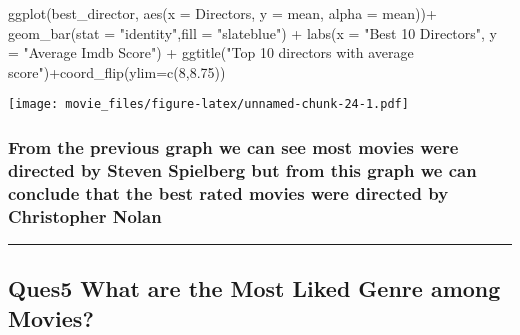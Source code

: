 \documentclass[
]{article}
\newenvironment{Shaded}{\begin{snugshade}}{\end{snugshade}}
\newcommand{\AttributeTok}[1]{\textcolor[rgb]{0.77,0.63,0.00}{#1}}
\newcommand{\DecValTok}[1]{\textcolor[rgb]{0.00,0.00,0.81}{#1}}
\newcommand{\FloatTok}[1]{\textcolor[rgb]{0.00,0.00,0.81}{#1}}
\newcommand{\FunctionTok}[1]{\textcolor[rgb]{0.00,0.00,0.00}{#1}}
\newcommand{\NormalTok}[1]{#1}
\newcommand{\SpecialCharTok}[1]{\textcolor[rgb]{0.00,0.00,0.00}{#1}}
\newcommand{\StringTok}[1]{\textcolor[rgb]{0.31,0.60,0.02}{#1}}
\begin{document}
\begin{Shaded}
\begin{Highlighting}[]
\FunctionTok{ggplot}\NormalTok{(best\_director, }\FunctionTok{aes}\NormalTok{(}\AttributeTok{x =}\NormalTok{ Directors, }\AttributeTok{y =}\NormalTok{ mean, }\AttributeTok{alpha =}\NormalTok{ mean))}\SpecialCharTok{+}
  \FunctionTok{geom\_bar}\NormalTok{(}\AttributeTok{stat =} \StringTok{"identity"}\NormalTok{,}\AttributeTok{fill =} \StringTok{"slateblue"}\NormalTok{) }\SpecialCharTok{+} \FunctionTok{labs}\NormalTok{(}\AttributeTok{x =} \StringTok{"Best 10 Directors"}\NormalTok{, }\AttributeTok{y =} \StringTok{"Average Imdb Score"}\NormalTok{) }\SpecialCharTok{+} 
  \FunctionTok{ggtitle}\NormalTok{(}\StringTok{"Top 10 directors with average score"}\NormalTok{)}\SpecialCharTok{+}\FunctionTok{coord\_flip}\NormalTok{(}\AttributeTok{ylim=}\FunctionTok{c}\NormalTok{(}\DecValTok{8}\NormalTok{,}\FloatTok{8.75}\NormalTok{))}
\end{Highlighting}
\end{Shaded}

\texttt{[image: movie\_files/figure-latex/unnamed-chunk-24-1.pdf]}

\hypertarget{from-the-previous-graph-we-can-see-most-movies-were-directed-by-steven-spielberg-but-from-this-graph-we-can-conclude-that-the-best-rated-movies-were-directed-by-christopher-nolan}{%
\subsubsection{\texorpdfstring{\textbf{From the previous graph we can
see most movies were directed by Steven Spielberg but from this graph we
can conclude that the best rated movies were directed by Christopher
Nolan}}{From the previous graph we can see most movies were directed by Steven Spielberg but from this graph we can conclude that the best rated movies were directed by Christopher Nolan}}\label{from-the-previous-graph-we-can-see-most-movies-were-directed-by-steven-spielberg-but-from-this-graph-we-can-conclude-that-the-best-rated-movies-were-directed-by-christopher-nolan}}

\begin{center}\rule{0.5\linewidth}{0.5pt}\end{center}

\hypertarget{q5}{%
\subsection{Ques5 What are the Most Liked Genre among
Movies?}\label{q5}}
\end{document}
